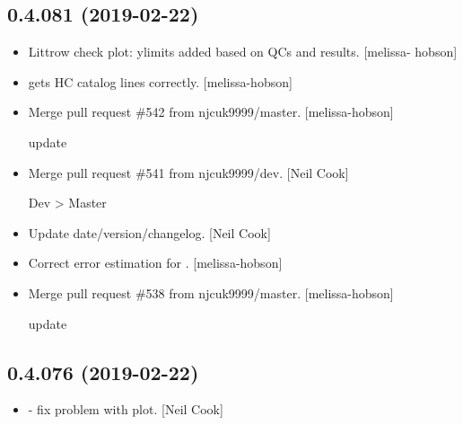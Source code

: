 \documentclass[a4paper,10pt,english]{report}
\begin{document}
\subsection{0.4.081 (2019-02-22)}
\label{\detokenize{misc/changelog:id179}}\begin{itemize}
\item {} 
Littrow check plot: ylimits added based on QCs and results. {[}melissa-
hobson{]}

\item {} 
 gets HC catalog lines correctly. {[}melissa-hobson{]}

\item {} 
Merge pull request \#542 from njcuk9999/master. {[}melissa-hobson{]}

update

\item {} 
Merge pull request \#541 from njcuk9999/dev. {[}Neil Cook{]}

Dev \textendash{}\textgreater{} Master

\item {} 
Update date/version/changelog. {[}Neil Cook{]}

\item {} 
Correct error estimation for . {[}melissa-hobson{]}

\item {} 
Merge pull request \#538 from njcuk9999/master. {[}melissa-hobson{]}

update

\end{itemize}


\subsection{0.4.076 (2019-02-22)}
\label{\detokenize{misc/changelog:id180}}\begin{itemize}
\item {} 
 - fix problem with  plot. {[}Neil
Cook{]}

\end{itemize}
\end{document}
